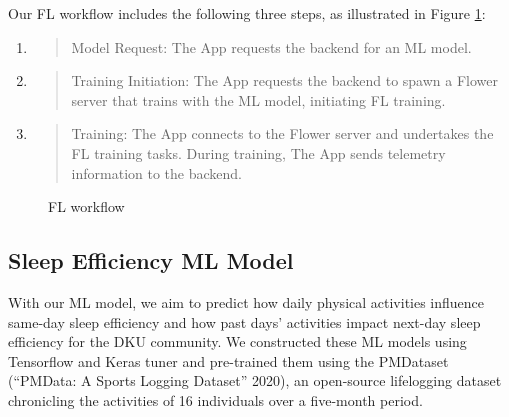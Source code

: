 \documentclass{article}
\begin{document}
\begin{multicols}{2}
Our FL workflow includes the following three steps, as illustrated in Figure
\ref{fig:fl-workflow}:

\begin{enumerate}
\def\labelenumi{\arabic{enumi}.}
\item
  \begin{quote}
  Model Request: The App requests the backend for an ML model.
  \end{quote}
\item
  \begin{quote}
  Training Initiation: The App requests the backend to spawn a Flower
  server that trains with the ML model, initiating FL training.
  \end{quote}
\item
  \begin{quote}
  Training: The App connects to the Flower server and undertakes the FL
  training tasks. During training, The App sends telemetry information
  to the backend.
  \end{quote}
\end{enumerate}

\begin{figure}[H]
\centering
{}
\caption{FL workflow}
\label{fig:fl-workflow}
\end{figure}

\subsection{Sleep Efficiency ML Model}

With our ML model, we aim to predict how daily physical activities
influence same-day sleep efficiency and how past days'
activities impact next-day sleep efficiency for the DKU community. We
constructed these ML models using Tensorflow and Keras tuner and
pre-trained them using the PMDataset (``PMData: A Sports Logging
Dataset'' 2020), an open-source lifelogging dataset chronicling the
activities of 16 individuals over a five-month period.


\end{multicols}
\end{document}
